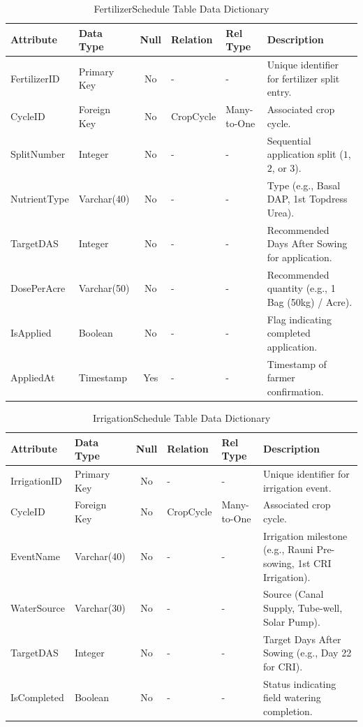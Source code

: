 \begin{table}[H]
\footnotesize
\centering
\caption{FertilizerSchedule Table Data Dictionary}
\label{tab:fertilizer_table}
\begin{tabular}{|l|l|c|l|l|p{4.5cm}|}
\hline
\textbf{Attribute} & \textbf{Data Type} & \textbf{Null} & \textbf{Relation} & \textbf{Rel Type} & \textbf{Description} \\ \hline
FertilizerID & Primary Key & No & - & - & Unique identifier for fertilizer split entry. \\ \hline
CycleID & Foreign Key & No & CropCycle & Many-to-One & Associated crop cycle. \\ \hline
SplitNumber & Integer & No & - & - & Sequential application split ($1$, $2$, or $3$). \\ \hline
NutrientType & Varchar(40) & No & - & - & Type (e.g., Basal DAP, 1st Topdress Urea). \\ \hline
TargetDAS & Integer & No & - & - & Recommended Days After Sowing for application. \\ \hline
DosePerAcre & Varchar(50) & No & - & - & Recommended quantity (e.g., 1 Bag (50kg) / Acre). \\ \hline
IsApplied & Boolean & No & - & - & Flag indicating completed application. \\ \hline
AppliedAt & Timestamp & Yes & - & - & Timestamp of farmer confirmation. \\ \hline
\end{tabular}
\end{table}

\begin{table}[H]
\footnotesize
\centering
\caption{IrrigationSchedule Table Data Dictionary}
\label{tab:irrigation_table}
\begin{tabular}{|l|l|c|l|l|p{4.5cm}|}
\hline
\textbf{Attribute} & \textbf{Data Type} & \textbf{Null} & \textbf{Relation} & \textbf{Rel Type} & \textbf{Description} \\ \hline
IrrigationID & Primary Key & No & - & - & Unique identifier for irrigation event. \\ \hline
CycleID & Foreign Key & No & CropCycle & Many-to-One & Associated crop cycle. \\ \hline
EventName & Varchar(40) & No & - & - & Irrigation milestone (e.g., Rauni Pre-sowing, 1st CRI Irrigation). \\ \hline
WaterSource & Varchar(30) & No & - & - & Source (Canal Supply, Tube-well, Solar Pump). \\ \hline
TargetDAS & Integer & No & - & - & Target Days After Sowing (e.g., Day 22 for CRI). \\ \hline
IsCompleted & Boolean & No & - & - & Status indicating field watering completion. \\ \hline
\end{tabular}
\end{table}

